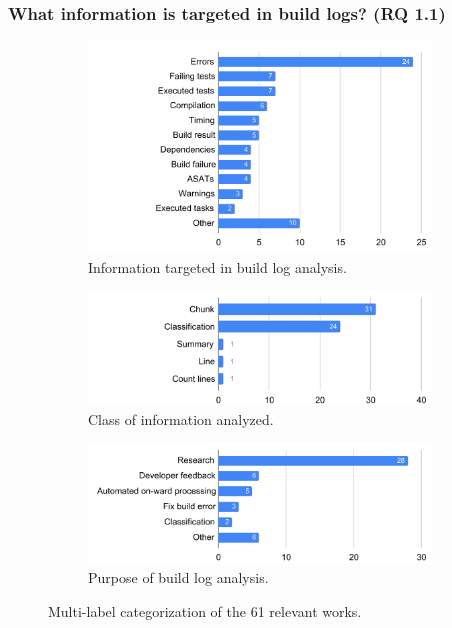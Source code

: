 \subsubsection{What information is targeted in build logs? (RQ 1.1)}
\label{sec:rq11}
\begin{figure}
\centering
\begin{subfigure}[t]{\columnwidth}
		\centering
		\includegraphics[width=\columnwidth,
		clip]{img/lit-sur/info_target.pdf}
		\caption{Information targeted in build log analysis.}
		\label{fig:litsur:info_target}

\end{subfigure}\hspace{\fill}
\begin{subfigure}[t]{\columnwidth}
		\centering
				\includegraphics[width=\columnwidth,
				clip]{img/lit-sur/kind.pdf}
		\caption{Class of information analyzed.}
		\label{fig:litsur:kind}

\end{subfigure}
\begin{subfigure}[t]{\columnwidth}
		\centering
				\includegraphics[width=\columnwidth,
				clip]{img/lit-sur/use.pdf}
		\caption{Purpose of build log analysis.}
		\label{fig:litsur:use}

\end{subfigure}

\caption{Multi-label categorization of the 61 relevant works.}
\label{fig:litsur_r}
\end{figure}

